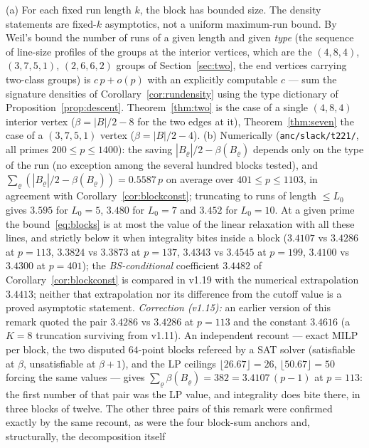 \begin{remark}\label{rem:blocks}
(a) For each fixed run length $k$, the block has bounded size.  The density statements are fixed-$k$ asymptotics, not a uniform maximum-run bound.  By Weil's bound the number of runs of a given length and given \emph{type} (the sequence of line-size profiles of the groups at the
interior vertices, which are the $(4,8,4)$, $(3,7,5,1)$, $(2,6,6,2)$ groups of Section~\ref{sec:two}, the end vertices carrying two-class
groups) is $c\,p+o(p)$ with an explicitly computable $c$ --- sum the signature densities of Corollary~\ref{cor:rundensity}
using the type dictionary of Proposition~\ref{prop:descent}.  Theorem~\ref{thm:two} is the case of a single $(4,8,4)$ interior vertex ($\beta=|B|/2-8$ for the
two edges at it), Theorem~\ref{thm:seven} the case of a $(3,7,5,1)$ vertex ($\beta=|B|/2-4$).
(b) Numerically (\texttt{anc/slack/t221/}, all primes $200\le p\le1400$): the saving $|B_\varrho|/2-\beta(B_\varrho)$ depends only on the type of the run
(no exception among the several hundred blocks tested), and $\sum_\varrho(|B_\varrho|/2-\beta(B_\varrho))=0.5587\,p$ on average over
$401\le p\le1103$, in agreement with Corollary~\ref{cor:blockconst}; truncating to runs of length $\le L_0$ gives
$3.595$ for $L_0=5$, $3.480$ for $L_0=7$ and $3.452$ for $L_0=10$.  At a given prime the bound~\eqref{eq:blocks} is at most the value of the linear relaxation with
all these lines, and strictly below it when integrality bites inside a block ($3.4107$ vs $3.4286$ at $p=113$, $3.3824$ vs $3.3873$ at
$p=137$, $3.4343$ vs $3.4545$ at $p=199$, $3.4100$ vs $3.4300$ at $p=401$); the \emph{BS-conditional} coefficient $3.4482$ of
Corollary~\ref{cor:blockconst} is compared in v1.19 with the numerical extrapolation $3.4413$; neither that extrapolation nor its difference from the cutoff value is a proved asymptotic statement.
\emph{Correction (v1.15):} an earlier version of this remark quoted the pair $3.4286$ vs $3.4286$ at $p=113$ and
the constant $3.4616$ (a $K=8$ truncation surviving from v1.11).  An independent recount --- exact MILP per block,
the two disputed $64$-point blocks refereed by a SAT solver (satisfiable at $\beta$, unsatisfiable at $\beta+1$),
and the LP ceilings $\lfloor26.67\rfloor=26$, $\lfloor50.67\rfloor=50$ forcing the same values --- gives
$\sum_\varrho\beta(B_\varrho)=382=3.4107\,(p-1)$ at $p=113$: the first number of that pair was the LP value, and
integrality does bite there, in three blocks of twelve.  The other three pairs of this remark were confirmed
exactly by the same recount, as were the four block-sum anchors and, structurally, the decomposition itself

\end{remark}
